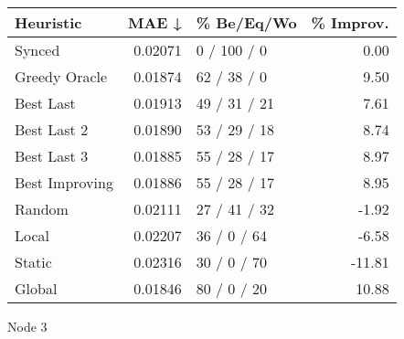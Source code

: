 \begin{tabular}{lrlr}
\toprule
\textbf{Heuristic} & \textbf{MAE ↓} & \textbf{\% Be/Eq/Wo} & \textbf{\% Improv.} \\
\midrule
            Synced &        0.02071 &          0 / 100 / 0 &                0.00 \\
     Greedy Oracle &        0.01874 &          62 / 38 / 0 &                9.50 \\
         Best Last &        0.01913 &         49 / 31 / 21 &                7.61 \\
       Best Last 2 &        0.01890 &         53 / 29 / 18 &                8.74 \\
       Best Last 3 &        0.01885 &         55 / 28 / 17 &                8.97 \\
    Best Improving &        0.01886 &         55 / 28 / 17 &                8.95 \\
            Random &        0.02111 &         27 / 41 / 32 &               -1.92 \\
             Local &        0.02207 &          36 / 0 / 64 &               -6.58 \\
            Static &        0.02316 &          30 / 0 / 70 &              -11.81 \\
            Global &        0.01846 &          80 / 0 / 20 &               10.88 \\
\bottomrule
\end{tabular}
\caption{Node 3}
\label{tab:non_lr05_le2_bs4_3}

